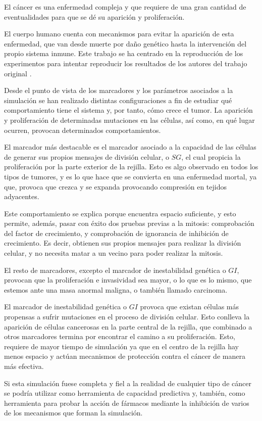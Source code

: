 El cáncer es una enfermedad compleja y que requiere de una gran cantidad
de eventualidades para que se dé su aparición y proliferación.

El cuerpo humano cuenta con mecanismos para evitar la aparición de esta enfermedad,
que van desde muerte por daño genético hasta la intervención del propio sistema inmune.
Este trabajo se ha centrado en la reproducción de los experimentos para intentar reproducir
los resultados de los autores del trabajo original \cite{jsantos-amonteagudo-1-2014}.

Desde el punto de vista de los marcadores y los parámetros asociados a la simulación se
han realizado distintas configuraciones a fin de estudiar qué comportamiento tiene el sistema y, por tanto,
cómo crece el tumor. La aparición y proliferación de determinadas mutaciones en las células, así como, en qué lugar ocurren,
provocan determinados comportamientos.

El marcador más destacable es el marcador asociado a la capacidad de las células de generar sus propios mensajes de división celular,
o $SG$, el cual propicia la proliferación por la parte exterior de la rejilla.
Esto es algo observado en todos los tipos de tumores, y es lo que hace que se convierta en una
enfermedad mortal, ya que, provoca que crezca y se expanda provocando compresión en tejidos
adyacentes.

Este comportamiento se explica porque encuentra espacio suficiente, y esto permite, además, pasar con éxito dos pruebas previas a la mitosis:
comprobación del factor de crecimiento, y comprobación de ignorancia de inhibición de crecimiento.
Es decir, obtienen sus propios mensajes para realizar la división celular, y no necesita
matar a un vecino para poder realizar la mitosis.

El resto de marcadores, excepto el marcador de inestabilidad genética o $GI$, provocan
que la proliferación e invasividad sea mayor, o lo que es lo mismo, que estemos ante una
masa anormal maligna, o también llamado carcinoma.

\newpage

El marcador de inestabilidad genética o $GI$ provoca que existan células más propensas
a sufrir mutaciones en el proceso de división celular. Esto conlleva la aparición
de células cancerosas en la parte central de la rejilla, que combinado a otros marcadores
termina por encontrar el camino a su proliferación. Esto, requiere de mayor tiempo de simulación
ya que en el centro de la rejilla hay menos espacio y actúan mecanismos de protección contra
el cáncer de manera más efectiva.

Si esta simulación fuese completa y fiel a la realidad de cualquier tipo de cáncer se
podría utilizar como herramienta de capacidad predictiva y, también, como herramienta
para probar la acción de fármacos mediante la inhibición de varios de los mecanismos
que forman la simulación.
